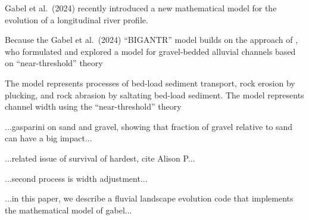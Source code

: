 \documentclass[journal abbreviation, manuscript]{copernicus}
\begin{document}
Gabel et al.~(2024) recently introduced a new mathematical model for the evolution of a longitudinal river profile. 


Because the Gabel et al.~(2024) ``BIGANTR'' model builds on the approach of \citet{wickert2018}, who formulated and explored a model for gravel-bedded alluvial channels based on ``near-threshold'' theory

The model represents processes of bed-load sediment transport, rock erosion by plucking, and rock abrasion by saltating bed-load sediment. The model represents channel width using the ``near-threshold'' theory


...gasparini on sand and gravel, showing that fraction of gravel relative to sand can have a big impact...

...related issue of survival of hardest, cite Alison P...

...second process is width adjustment...

...in this paper, we describe a fluvial landscape evolution code that implements the mathematical model of gabel...
\end{document}
